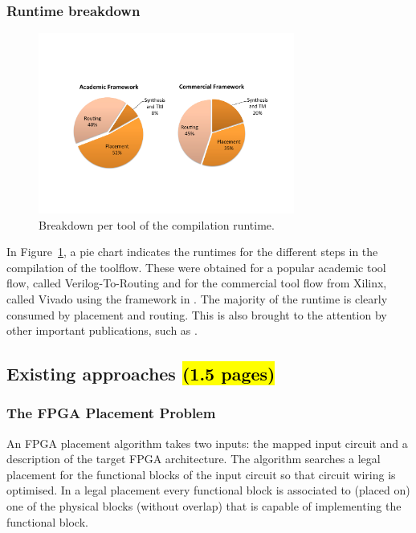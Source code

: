 \documentclass[a4paper,oneside,12pt]{article}
\begin{document}
\subsubsection{Runtime breakdown}
\begin{figure}[t]
\centering
\includegraphics[width = 0.75\textwidth,trim = 0mm 50mm 0mm 40mm, clip]{runtime_breakdown}
\caption{Breakdown per tool of the compilation runtime.}
\label{rt}
\end{figure}

In Figure~\ref{rt}, a pie chart indicates the runtimes for the different steps in the compilation of the toolflow. These were obtained for a popular academic tool flow, called Verilog-To-Routing\cite{luu2014vtr} and for the commercial tool flow from Xilinx, called Vivado \cite{feist2012vivado} using the framework in \cite{vansteenkiste2015analyzing}. The majority of the runtime is clearly consumed by placement and routing. This is also brought to the attention by other important publications, such as \cite{murray2015timing}.

\subsection{Existing approaches \hl{(1.5 pages)}}

\subsubsection{The FPGA Placement Problem}
\label{sec:placeprob}
An FPGA placement algorithm takes two inputs: the mapped input circuit and a description of the target FPGA architecture. The algorithm searches a legal placement for the functional blocks of the input circuit so that circuit wiring is optimised. In a legal placement every functional block is associated to (placed on) one of the physical blocks (without overlap) that is capable of implementing the functional block. 
\end{document}
